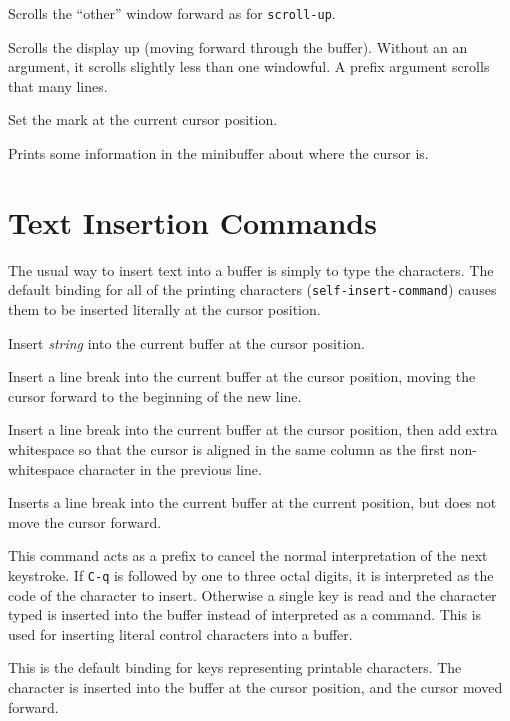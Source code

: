 \fbody Scrolls the ``other'' window forward as for {\tt scroll-up}.

\fbody Scrolls the display up (moving forward through the buffer).  Without an
an argument, it scrolls slightly less than one windowful.  A prefix argument
scrolls that many lines.

\fbody Set the mark at the current cursor position.

\fbody Prints some information in the minibuffer about where the cursor is.


\chapter{Text Insertion Commands}

The usual way to insert text into a buffer is simply to type the
characters.  The default binding for all of the printing characters
({\tt self-insert-command}) causes them to be inserted literally at
the cursor position. 

\fbody Insert {\em string\/} into the current buffer at the cursor position.

\fbody Insert a line break into the current buffer at the cursor position,
moving the cursor forward to the beginning of the new line.

\fbody Insert a line break into the current buffer at the cursor position,
then add extra whitespace so that the cursor is aligned in the same
column as the first non-whitespace character in the previous line.

\fbody Inserts a line break into the current buffer at the current position,
but does not move the cursor forward.

\fbody This command acts as a prefix to
cancel the normal interpretation of the next keystroke.  If {\tt C-q}
is followed by one to three octal digits, it is interpreted as the
code of the character to insert.  Otherwise a single key is read and
the character typed is inserted into the buffer instead of interpreted
as a command.  This is used for inserting literal control characters
into a buffer. 

\fbody This is the default binding for keys representing printable
characters.  The character is inserted into the buffer at the cursor
position, and the cursor moved forward.

